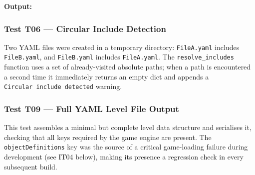 \textbf{Output:}

\begin{Shaded}
\begin{Highlighting}[]
\KeywordTok{: }\CharTok{|}
\NormalTok{  \_\_,\_\_,\_\_,\_\_}
\end{Highlighting}
\end{Shaded}

\subsubsection{Test T06 --- Circular Include
Detection}\label{test-t06-circular-include-detection}

Two YAML files were created in a temporary directory:
\texttt{FileA.yaml} includes \texttt{FileB.yaml}, and
\texttt{FileB.yaml} includes \texttt{FileA.yaml}. The
\texttt{resolve\_includes} function uses a set of already-visited
absolute paths; when a path is encountered a second time it immediately
returns an empty dict and appends a
\texttt{\textquotesingle{}Circular\ include\ detected\textquotesingle{}}
warning.

\begin{Shaded}
\begin{Highlighting}[]

\OperatorTok{=}\NormalTok{)}
 \NormalTok{(} 
\end{Highlighting}
\end{Shaded}

\subsubsection{Test T09 --- Full YAML Level File
Output}\label{test-t09-full-yaml-level-file-output}

This test assembles a minimal but complete level data structure and
serialises it, checking that all keys required by the game engine are
present. The \texttt{objectDefinitions} key was the source of a critical
game-loading failure during development (see IT04 below), making its
presence a regression check in every subsequent build.

